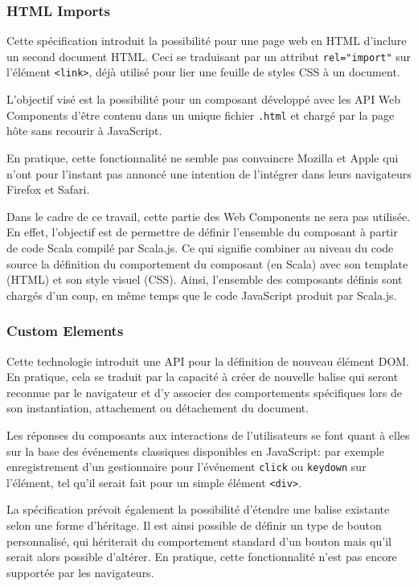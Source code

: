 \subsubsection{HTML Imports}

Cette spécification introduit la possibilité pour une page web en HTML d'inclure un second document HTML. Ceci se traduisant par un attribut \texttt{rel="import"} sur l'élément \texttt{<link>}, déjà utilisé pour lier une feuille de styles CSS à un document.

L'objectif visé est la possibilité pour un composant développé avec les API Web Components d'être contenu dans un unique fichier \texttt{.html} et chargé par la page hôte sans recourir à JavaScript.

En pratique, cette fonctionnalité ne semble pas convaincre Mozilla et Apple qui n'ont pour l'instant pas annoncé une intention de l'intégrer dans leurs navigateurs Firefox et Safari.

Dans le cadre de ce travail, cette partie des Web Components ne sera pas utilisée. En effet, l'objectif est de permettre de définir l'ensemble du composant à partir de code Scala compilé par Scala.js. Ce qui signifie combiner au niveau du code source la définition du comportement du composant (en Scala) avec son template (HTML) et son style visuel (CSS). Ainsi, l'ensemble des composants définis sont chargés d'un coup, en même temps que le code JavaScript produit par Scala.js.

\subsubsection{Custom Elements}

Cette technologie introduit une API pour la définition de nouveau élément DOM. En pratique, cela se traduit par la capacité à créer de nouvelle balise qui seront reconnue par le navigateur et d'y associer des comportements spécifiques lors de son instantiation, attachement ou détachement du document.

Les réponses du composants aux interactions de l'utilisateurs se font quant à elles sur la base des événements classiques disponibles en JavaScript: par exemple enregistrement d'un gestionnaire pour l'événement \texttt{click} ou \texttt{keydown} sur l'élément, tel qu'il serait fait pour un simple élément \texttt{<div>}.

La spécification prévoit également la possibilité d'étendre une balise existante selon une forme d'héritage. Il est ainsi possible de définir un type de bouton personnalisé, qui hériterait du comportement standard d'un bouton mais qu'il serait alors possible d'altérer. En pratique, cette fonctionnalité n'est pas encore supportée par les navigateurs.

